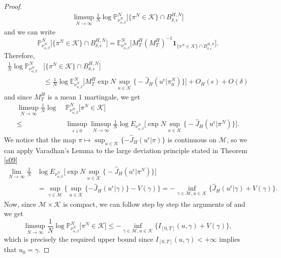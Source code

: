 \documentclass[reqno]{amsart}
\begin{document}
\begin{proof}
\[\begin{split}
\limsup_{N\to\infty} \frac 1N  \log
{{\mathbb P}}^N_{\nu^N_{\alpha, \beta}}
\big[\{\pi^N\in{{\mathscr K}}\}\cap B^{H,N}_{\delta , \epsilon}\big]  
\end{split}
\]
and we can write
\[
{{\mathbb P}}^N_{\nu^N_{\alpha, \beta}}
\big[\{\pi^N\in{{\mathscr K}}\}\cap B^{H,N}_{\delta , \epsilon}\big]
={{\mathbb E}}^N_{\nu^N_{\alpha, \beta}}
\big[M^H_T (M^H_T )^{-1}{{\mathbf 1}}_{\{\pi^N\in{{\mathscr K}}\}\cap B^{H,N}_{\delta , \epsilon}}\big].
\]
Therefore,
\[
\begin{split}
 \frac 1N  \log{{\mathbb P}}^N_{\nu^N_{\alpha, \beta}}
&\big[\{\pi^N\in{{\mathscr K}}\}\cap B^{H,N}_{\delta , \epsilon}\big]\\
&\le \frac 1N  \log{{\mathbb E}}^N_{\nu^N_{\alpha, \beta}}
\Big[M^H_T  \exp N\sup_{u\in {{\mathscr K}}}\big\{  -\hat J_{H}
(u^\epsilon|\pi^N_0)\big \} \Big]+O_H(\epsilon)+O(\delta)
\end{split}
\]
and since $M^H_T$ is a mean $1$ martingale, we get
\[
\begin{split}
 \limsup_{N\to\infty} \frac 1N  \log\;
&{{\mathbb P}}^N_{\nu^N_{\alpha, \beta}}
\big[\pi^N\in{{\mathscr K}}\big]
\\
\le 
&\limsup_{\epsilon\downarrow 0}
\limsup_{N\to\infty} \frac 1N  \log
E_{\nu^N_{\alpha, \beta}}
\Big[\exp N\sup_{u\in {{\mathscr K}}}\big\{  -\hat J_{H}
(u^\epsilon|\pi^N)\big \} \Big].
\end{split}
\]
We notice that the map $\pi\mapsto \sup_{u\in {{\mathscr K}}}\{ -\hat
J_{H} (u^\epsilon|\pi)\}$ is continuous on ${{\mathscr M}}$, so we can
apply Varadhan's Lemma to the large deviation principle stated in Theorem
\ref{s09}
\[
\begin{split}  
\lim_{N\to\infty} \frac 1N  
&\log
E_{\nu^N_{\alpha, \beta}}
\Big[\exp N\sup_{u\in {{\mathscr K}}}\big\{  -\hat J_{H}
(u^\epsilon|\pi^N)\big \} \Big]\\
&=\sup_{\gamma\in{{\mathscr M}}}\big\{\sup_{u\in {{\mathscr K}}}\{  -\hat J_{H}
(u^\epsilon|\gamma)\}-V(\gamma)\big\}
=-\inf_{\gamma\in{{\mathscr M}}, u\in{{\mathscr K}}}\{  \hat J_{H}
(u^\epsilon|\gamma)+V(\gamma)\}.
\end{split}
\]
Now, since ${{\mathscr M}}\times{{\mathscr K}}$ is compact, we can follow step by step
the arguments of \cite[section 3.3]{blm1} and we get
\[
 \limsup_{N\to\infty} \frac 1N  \log
{{\mathbb P}}^N_{\nu^N_{\alpha, \beta}}
\big[\pi^N\in{{\mathscr K}}\big]
\le -\inf_{\gamma\in{{\mathscr M}}, u\in{{\mathscr K}}}\{I_{[0,T]}(u,\gamma)+V(\gamma)\},
\]
which is precisely the required upper bound since
$I_{[0,T]}(u,\gamma)<+\infty$ implies that $u_0=\gamma$.


\end{proof}
\end{document}
